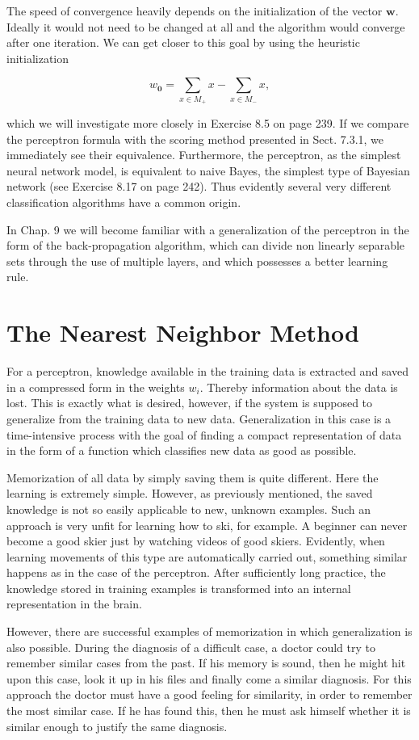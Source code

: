 \documentclass[10pt]{book}
\begin{document}
The speed of convergence heavily depends on the initialization of the vector $\boldsymbol{w}$. Ideally it would not need to be changed at all and the algorithm would converge after one iteration. We can get closer to this goal by using the heuristic initialization

$$
w_{\mathbf{0}}=\sum_{x \in M_{+}} x-\sum_{x \in M_{-}} x,
$$

which we will investigate more closely in Exercise 8.5 on page 239.
If we compare the perceptron formula with the scoring method presented in Sect. 7.3.1, we immediately see their equivalence. Furthermore, the perceptron, as the simplest neural network model, is equivalent to naive Bayes, the simplest type of Bayesian network (see Exercise 8.17 on page 242). Thus evidently several very different classification algorithms have a common origin.

In Chap. 9 we will become familiar with a generalization of the perceptron in the form of the back-propagation algorithm, which can divide non linearly separable sets through the use of multiple layers, and which possesses a better learning rule.

\section{The Nearest Neighbor Method}
For a perceptron, knowledge available in the training data is extracted and saved in a compressed form in the weights $w_{i}$. Thereby information about the data is lost. This is exactly what is desired, however, if the system is supposed to generalize from the training data to new data. Generalization in this case is a time-intensive process with the goal of finding a compact representation of data in the form of a function which classifies new data as good as possible.

Memorization of all data by simply saving them is quite different. Here the learning is extremely simple. However, as previously mentioned, the saved knowledge is not so easily applicable to new, unknown examples. Such an approach is very unfit for learning how to ski, for example. A beginner can never become a good skier just by watching videos of good skiers. Evidently, when learning movements of this type are automatically carried out, something similar happens as in the case of the perceptron. After sufficiently long practice, the knowledge stored in training examples is transformed into an internal representation in the brain.

However, there are successful examples of memorization in which generalization is also possible. During the diagnosis of a difficult case, a doctor could try to remember similar cases from the past. If his memory is sound, then he might hit upon this case, look it up in his files and finally come a similar diagnosis. For this approach the doctor must have a good feeling for similarity, in order to remember the most similar case. If he has found this, then he must ask himself whether it is similar enough to justify the same diagnosis.
\end{document}

